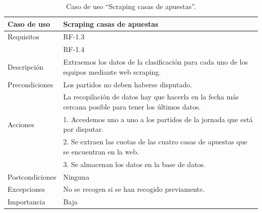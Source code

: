\begin{table}
  \begin{center}
   \begin{tabular}{|p{3cm} | p{9cm} |}
    \hline
    Caso de uso & Scraping casas de apuestas\\
    \hline
    Requisitos & RF-1.3\\
    & RF-1.4\\
    \hline
    Descripción & Extraemos los datos de la clasificación para cada uno de los equipos mediante web scraping.\\
    \hline
    Precondiciones &Los partidos no deben haberse disputado.\\
    &La recopilación de datos hay que hacerla en la fecha más cercana posible para tener los últimos datos.\\
    \hline
  	Acciones & 1. Accedemos uno a uno a los partidos de la jornada que está por disputar. \\
    &2. Se extraen las cuotas de las cuatro casas de apuestas que se encuentran en la web.\\
    &3. Se almacenan los datos en la base de datos.\\
    \hline
    Postcondiciones & Ninguna \\
    \hline
    Excepciones & No se recogen si se han recogido previamente.\\
    \hline
    Importancia & Baja \\
    \hline
   \end{tabular}
   \caption{Caso de uso ``Scraping casas de apuestas''.}
   \label{tabla:casoUso1.4}
  \end{center}
 \end{table} 


